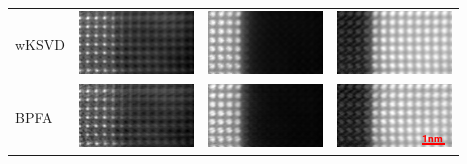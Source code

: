 \begin{tabular}{m{2cm}*{3}{M{0.24\textwidth}}}
    wKSVD&
    \includegraphics[width=\tmplength]{img/chapitre4/figure9/img/wKSVD_band_0.png}&
    \includegraphics[width=\tmplength]{img/chapitre4/figure9/img/wKSVD_band_1.png}&
    \includegraphics[width=\tmplength]{img/chapitre4/figure9/img/wKSVD_band_2.png}\\
    BPFA&
    \includegraphics[width=\tmplength]{img/chapitre4/figure9/img/BPFA_band_0.png}&
    \includegraphics[width=\tmplength]{img/chapitre4/figure9/img/BPFA_band_1.png}&
    \includegraphics[width=\tmplength]{img/chapitre4/figure9/img/BPFA_band_2_size.png}\\
\end{tabular}